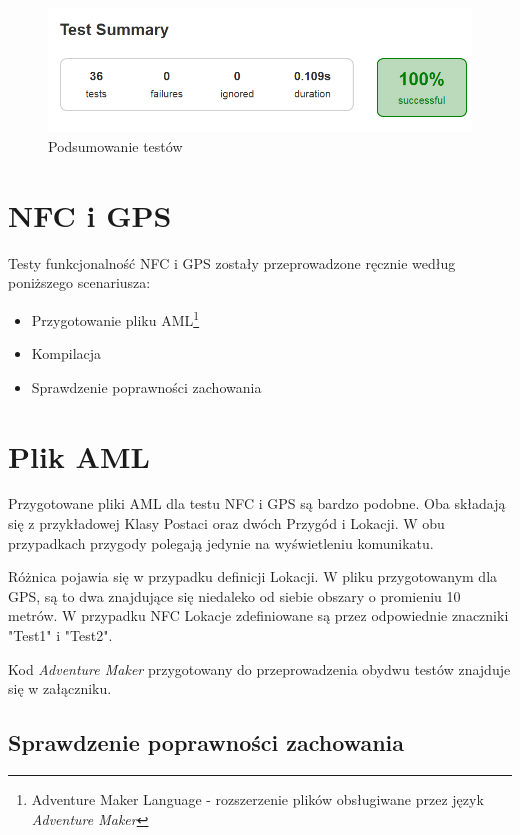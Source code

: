 \documentclass[openright]{xmgr}
\begin{document}
\begin{figure}[!tbh]
	\centering
	\includegraphics[width=1.0\hsize]{fig/test_summary}
	\caption{Podsumowanie testów}
\end{figure}

\section{NFC i GPS}

Testy funkcjonalność NFC i GPS zostały przeprowadzone ręcznie według poniższego scenariusza:

\begin{itemize}
  \item Przygotowanie pliku AML\footnote{Adventure Maker Language - rozszerzenie plików obsługiwane przez język \textit{Adventure Maker}}
  \item Kompilacja
  \item Sprawdzenie poprawności zachowania
\end{itemize}

\section{Plik AML}

Przygotowane pliki AML dla testu NFC i GPS są bardzo podobne. Oba składają się z przykładowej Klasy Postaci oraz dwóch Przygód i Lokacji. W obu przypadkach przygody polegają jedynie na wyświetleniu komunikatu. 

Różnica pojawia się w przypadku definicji Lokacji. W pliku przygotowanym dla GPS, są to dwa znajdujące się niedaleko od siebie obszary o promieniu 10 metrów. W przypadku NFC Lokacje zdefiniowane są przez odpowiednie znaczniki "Test1" i "Test2".

Kod \textit{Adventure Maker} przygotowany do przeprowadzenia obydwu testów znajduje się w załączniku.

\subsection{Sprawdzenie poprawności zachowania}
\end{document}
